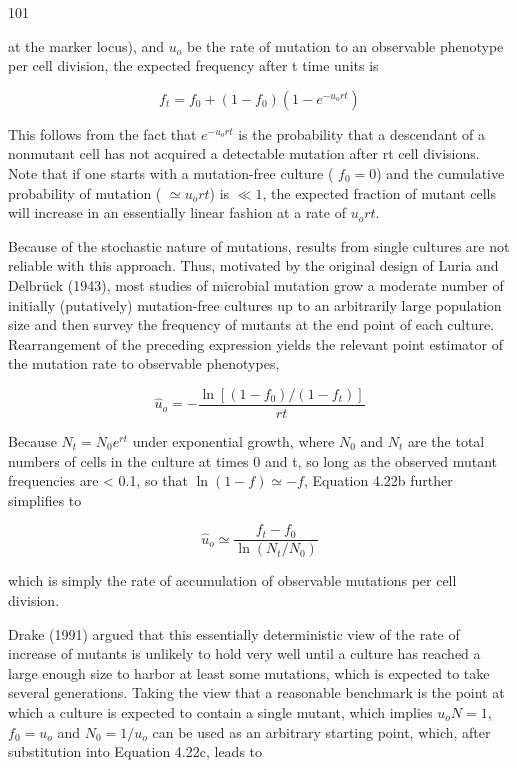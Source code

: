 \documentclass{article}
\begin{document}
101

at the marker locus), and  $ u_{o} $ be the rate of mutation to an observable phenotype per cell division, the expected frequency after t time units is

\begin{equation}
f_{t}=f_{0}+(1-f_{0})(1-e^{-u_{o}rt})
\tag{4.22a}
\label{eq:4_22a}
\end{equation}

This follows from the fact that  $ e^{-u_ort} $ is the probability that a descendant of a nonmutant cell has not acquired a detectable mutation after rt cell divisions. Note that if one starts with a mutation-free culture ( $ f_0 = 0 $) and the cumulative probability of mutation ( $ \simeq u_ort $) is  $ \ll 1 $, the expected fraction of mutant cells will increase in an essentially linear fashion at a rate of  $ u_ort $.

Because of the stochastic nature of mutations, results from single cultures are not reliable with this approach. Thus, motivated by the original design of Luria and Delbrück (1943), most studies of microbial mutation grow a moderate number of initially (putatively) mutation-free cultures up to an arbitrarily large population size and then survey the frequency of mutants at the end point of each culture. Rearrangement of the preceding expression yields the relevant point estimator of the mutation rate to observable phenotypes,

\begin{equation}
\widehat{u}_{o}=-\frac{\ln[(1-f_{0})/(1-f_{t})]}{rt}
\tag{4.22b}
\label{eq:4_22b}
\end{equation}

Because  $ N_t = N_0 e^{rt} $ under exponential growth, where  $ N_0 $ and  $ N_t $ are the total numbers of cells in the culture at times 0 and t, so long as the observed mutant frequencies are < 0.1, so that  $ \ln(1 - f) \simeq -f $, Equation 4.22b further simplifies to

\begin{equation}
\widehat{u}_{o}\simeq\frac{f_{t}-f_{0}}{\ln(N_{t}/N_{0})}
\tag{4.22c}
\label{eq:4_22c}
\end{equation}

which is simply the rate of accumulation of observable mutations per cell division.

Drake (1991) argued that this essentially deterministic view of the rate of increase of mutants is unlikely to hold very well until a culture has reached a large enough size to harbor at least some mutations, which is expected to take several generations. Taking the view that a reasonable benchmark is the point at which a culture is expected to contain a single mutant, which implies  $ u_o N = 1 $,  $ f_0 = u_o $ and  $ N_0 = 1/u_o $ can be used as an arbitrary starting point, which, after substitution into Equation 4.22c, leads to
\end{document}
